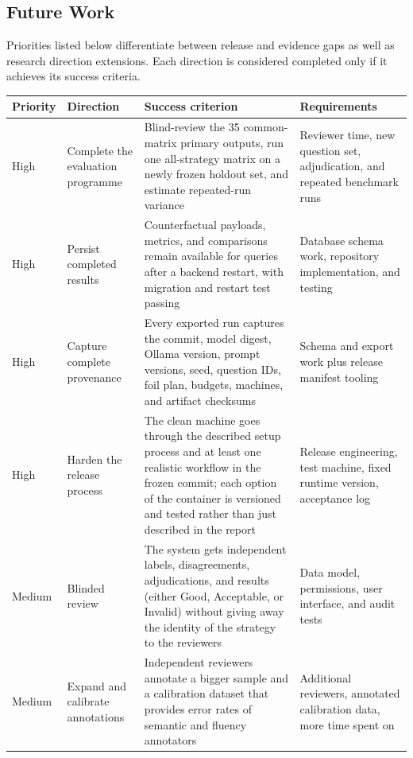 \documentclass[11pt,a4paper]{article}
\begin{document}
\clearpage

\subsection{Future Work}

Priorities listed below differentiate between release and evidence gaps as well as
research direction extensions. Each direction is considered completed only if it
achieves its success criteria.

\begin{table}[!htbp]
\centering
\footnotesize
\begin{tabularx}{\textwidth}{@{}L{1.05cm}L{2.5cm}Y Y@{}}
\toprule
\textbf{Priority} & \textbf{Direction} & \textbf{Success criterion} & \textbf{Requirements} \\
\midrule
High & Complete the evaluation programme & Blind-review the 35 common-matrix primary
outputs, run one all-strategy matrix on a newly frozen holdout set, and estimate
repeated-run variance & Reviewer time, new question set, adjudication, and repeated
benchmark runs \\
High & Persist completed results & Counterfactual payloads, metrics, and comparisons
remain available for queries after a backend restart, with migration and restart test
passing & Database schema work, repository implementation, and testing \\
High & Capture complete provenance & Every exported run captures the commit, model
digest, Ollama version, prompt versions, seed, question IDs, foil plan, budgets,
machines, and artifact checksums & Schema and export work plus release manifest tooling \\
High & Harden the release process & The clean machine goes through the described
setup process and at least one realistic workflow in the frozen commit; each option of
the container is versioned and tested rather than just described in the report &
Release engineering, test machine, fixed runtime version, acceptance log \\
Medium & Blinded review & The system gets independent labels, disagreements,
adjudications, and results (either Good, Acceptable, or Invalid) without giving away the
identity of the strategy to the reviewers & Data model, permissions, user interface,
and audit tests \\
Medium & Expand and calibrate annotations & Independent reviewers annotate a bigger
sample and a calibration dataset that provides error rates of semantic and fluency
annotators & Additional reviewers, annotated calibration data, more time spent on

\end{tabularx}
\end{table}
\end{document}
